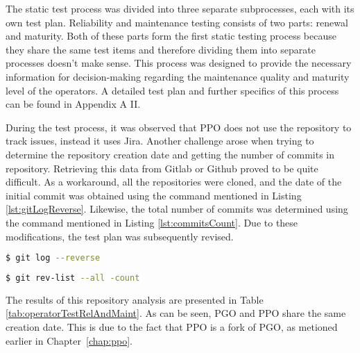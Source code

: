 The static test process was divided into three separate subprocesses, each with its own test plan.
\label{chap:testReliabilityAndMaintenance}
Reliability and maintenance testing consists of two parts: renewal and maturity. Both of these parts form the first static testing process because they share the same test items and therefore dividing them into separate processes doesn't make sense. This process was designed to provide the necessary information for decision-making regarding the maintenance quality and maturity level of the operators. A detailed test plan and further specifics of this process can be found in Appendix A II.

During the test process, it was observed that PPO does not use the repository to track issues, instead it uses Jira. Another challenge arose when trying to determine the repository creation date and getting the number of commits in repository. Retrieving this data from Gitlab or Github proved to be quite difficult. As a workaround, all the repositories were cloned, and the date of the initial commit was obtained using the command mentioned in Listing \ref{lst:gitLogReverse}.
Likewise, the total number of commits was determined using the command mentioned in Listing \ref{lst:commitsCount}. Due to these modifications, the test plan was subsequently revised.

\begin{lstlisting}[language=bash, caption={Reverse git log}, label={lst:gitLogReverse}]
        $ git log --reverse
\end{lstlisting}

\begin{lstlisting}[language=bash, caption={Commits count}, label={lst:commitsCount}]
    $ git rev-list --all -count
\end{lstlisting}

The results of this repository analysis are presented in Table \ref{tab:operatorTestRelAndMaint}. As can be seen, PGO and PPO share the same creation date. This is due to the fact that PPO is a fork of PGO, as metioned earlier in Chapter~\ref{chap:ppo}.

